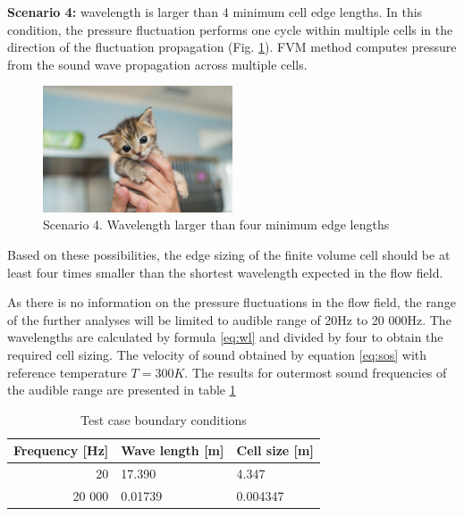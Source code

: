 \textbf{Scenario 4:} wavelength is larger than 4 minimum cell edge lengths. In this condition, the pressure fluctuation performs one cycle within multiple cells in the direction of the fluctuation propagation (Fig. \ref{scen4}). FVM method computes pressure from the sound wave propagation across multiple cells.

\begin{figure}[h!]
\centering %
\includegraphics[width=0.5\textwidth]{Pictures/kitten-placeholder.jpg}
\caption{Scenario 4. Wavelength larger than four minimum edge lengths}
\label{scen4}
\end{figure}

Based on these possibilities, the edge sizing of the finite volume cell should be at least four times smaller than the shortest wavelength expected in the flow field.

As there is no information on the pressure fluctuations in the flow field, the range of the further analyses will be limited to audible range of 20Hz to 20 000Hz. The wavelengths are calculated by formula \ref{eq:wl} and divided by four to obtain the required cell sizing. The velocity of sound obtained by equation \ref{eq:sos} with reference temperature $T = 300K$. The results for outermost sound frequencies of the audible range are presented in table \ref{tab:meshsize}

\begin{table}[htb!]
\centering
\caption{Test case boundary conditions} \label{tab:meshsize}
\begin{tabular}{ | r | l | l | } \hline
Frequency [Hz] & Wave length [m] & Cell size [m] \\ \hline \hline
20 & 17.390 & 4.347  \\ \hline
20 000 & 0.01739 & 0.004347 \\ \hline
\end{tabular}
\end{table}

